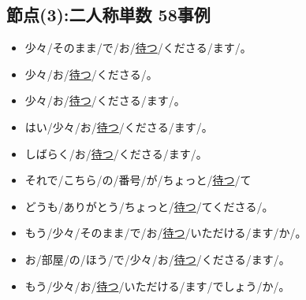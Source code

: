 \subsection{節点(3):二人称単数 58事例}
\begin{itemize}
\item 少々/そのまま/で/お/\underline{待つ}/くださる/ます/。
\item 少々/お/\underline{待つ}/くださる/。
\item 少々/お/\underline{待つ}/くださる/ます/。
\item はい/少々/お/\underline{待つ}/くださる/ます/。
\item しばらく/お/\underline{待つ}/くださる/ます/。
\item それで/こちら/の/番号/が/ちょっと/\underline{待つ}/て
\item どうも/ありがとう/ちょっと/\underline{待つ}/てくださる/。
\item もう/少々/そのまま/で/お/\underline{待つ}/いただける/ます/か/。
\item お/部屋/の/ほう/で/少々/お/\underline{待つ}/くださる/ます/。
\item もう/少々/お/\underline{待つ}/いただける/ます/でしょう/か/。
\end{itemize}



